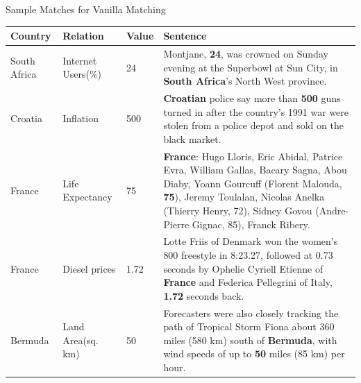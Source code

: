 \documentclass{beamer}
\begin{document}
\begin{frame}{Sample Matches for Vanilla Matching}

 \begin{table}
 \tiny
 \centering
 \begin{tabularx}{\textwidth}{|l|l|l|>{\raggedright}X|}
 \hline
 \textbf{Country} & \textbf{Relation} & \textbf{Value} & \textbf{Sentence}\tabularnewline
 \hline
  South Africa & Internet Users(\%) & 24 & Montjane, \textbf{24}, was crowned on Sunday evening at the Superbowl at Sun City, in \textbf{South Africa}'s North  West province.\tabularnewline
  \hline
 Croatia & Inflation & 500 & \textbf{Croatian} police say more than \textbf{500} guns turned in after the country's 1991 war were stolen from a police depot and sold on the black market.\tabularnewline
  \hline
  France & Life Expectancy & 75 & \textbf{France}: Hugo Lloris, Eric Abidal, Patrice Evra, William Gallas, Bacary Sagna, Abou Diaby, Yoann Gourcuff (Florent Malouda, \textbf{75}), Jeremy Toulalan, Nicolas Anelka (Thierry Henry, 72), Sidney Govou (Andre-Pierre Gignac, 85), Franck Ribery.\tabularnewline
  \hline
  France & Diesel prices & 1.72 & Lotte Friis of Denmark won the women's 800 freestyle in 8:23.27, followed at 0.73 seconds by Ophelie Cyriell Etienne of \textbf{France} and Federica Pellegrini of Italy, \textbf{1.72} seconds back.\tabularnewline
  \hline
  Bermuda & Land Area(sq. km) & 50 & Forecasters were also closely tracking the path of Tropical Storm Fiona about 360 miles (580 km) south of \textbf{Bermuda}, with wind speeds of up to \textbf{50} miles (85 km) per hour.\tabularnewline
  \hline
 \end{tabularx}
 \end{table}
\end{frame}
 
\end{document}
